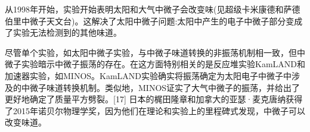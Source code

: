 从1998年开始，实验开始表明太阳和大气中微子会改变味(见超级卡米康德和萨德伯里中微子天文台)。这解决了太阳中微子问题:太阳中产生的电子中微子部分变成了实验无法检测到的其他味道。

尽管单个实验，如太阳中微子实验，与中微子味道转换的非振荡机制相一致，但中微子实验暗示中微子振荡的存在。在这方面特别相关的是反应堆实验KamLAND和加速器实验，如MINOS。KamLAND实验确实将振荡确定为太阳电子中微子中涉及的中微子味道转换机制。类似地，MINOS证实了大气中微子的振荡，并给出了更好地确定了质量平方劈裂。[17] 日本的梶田隆章和加拿大的亚瑟·麦克唐纳获得了2015年诺贝尔物理学奖，因为他们在理论和实验上的里程碑式发现，中微子可以改变味道。


















































